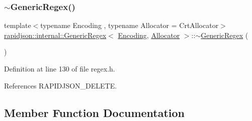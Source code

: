 \subsubsection{\texorpdfstring{$\sim$GenericRegex()}{~GenericRegex()}}
{\footnotesize\ttfamily template$<$typename Encoding , typename Allocator  = Crt\+Allocator$>$ \\
\mbox{\hyperlink{classrapidjson_1_1internal_1_1_generic_regex}{rapidjson\+::internal\+::\+Generic\+Regex}}$<$ \mbox{\hyperlink{classrapidjson_1_1_encoding}{Encoding}}, \mbox{\hyperlink{classrapidjson_1_1_allocator}{Allocator}} $>$\+::$\sim$\mbox{\hyperlink{classrapidjson_1_1internal_1_1_generic_regex}{Generic\+Regex}} (\begin{DoxyParamCaption}{ }\end{DoxyParamCaption})}



Definition at line 130 of file regex.\+h.


\begin{DoxyCode}{0}

\end{DoxyCode}


References R\+A\+P\+I\+D\+J\+S\+O\+N\+\_\+\+D\+E\+L\+E\+TE.



\subsection{Member Function Documentation}
\mbox{\label{classrapidjson_1_1internal_1_1_generic_regex_aea37ce79d98a28f203ff45df21b31c2d}} 
